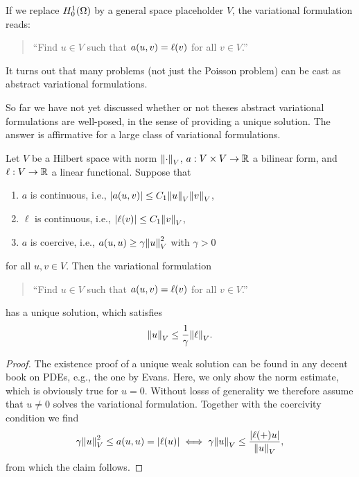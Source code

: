 If we replace \(H_0^1\parentheses*{\Omega}\) by a general space placeholder \(V\), the variational formulation reads:
\begin{quote}
	``Find \(u \in V\) such that \(a\parentheses*{u, v} = \ell\parentheses*{v}\) for all \(v \in V\).''
\end{quote}
It turns out that many problems (not just the Poisson problem) can be cast as abstract variational formulations.

So far we have not yet discussed whether or not theses abstract variational formulations are well-posed, in the sense of providing a unique solution.
The answer is affirmative for a large class of variational formulations.

\begin{theorem}
	Let \(V\) be a Hilbert space with norm \(\norm*{\cdot}_V\), \(a: V \times V \to \R\) a bilinear form, and \(\ell: V \to \R\) a linear functional.
	Suppose that
	\begin{enumerate}
		\item \(a\) is continuous, i.e., \(\absolute*{a\parentheses*{u, v}} \le C_1\norm*{u}_V\norm*{v}_V\),
		\item \(\ell\) is continuous, i.e., \(\absolute*{\ell\parentheses*{v}} \le C_1\norm*{v}_V\),
		\item \(a\) is coercive, i.e., \(a\parentheses*{u, u} \ge \gamma\norm*{u}_V^2\) with \(\gamma > 0\)
	\end{enumerate}
	for all \(u, v \in V\).
	Then the variational formulation
	\begin{quote}
		``Find \(u \in V\) such that \(a\parentheses*{u, v} = \ell\parentheses*{v}\) for all \(v \in V\).''
	\end{quote}
	has a unique solution, which satisfies
	\[
		\norm*{u}_V \le \frac{1}{\gamma}\norm*{\ell}_{V}.
	\]
\end{theorem}

\begin{proof}
	The existence proof of a unique weak solution can be found in any decent book on PDEs, e.g., the one by Evans.
	Here, we only show the norm estimate, which is obviously true for \(u = 0\).
	Without losss of generality we therefore assume that \(u \ne 0\) solves the variational formulation.
	Together with the coercivity condition we find
	\[
		\gamma\norm*{u}_V^2 \le a\parentheses*{u, u} = \absolute*{\ell\parentheses*{u}} \iff \gamma\norm*{u}_V \le \frac{\absolute*{\ell\parentheses+{u}}}{\norm*{u}_V},
	\]
	from which the claim follows.
\end{proof}

